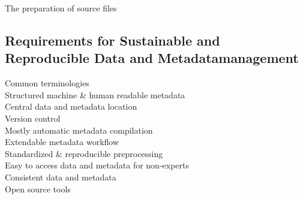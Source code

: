 The preparation of source files



\subsection{Requirements for Sustainable and Reproducible Data and Metadatamanagement}

\begin{description}
 \item[Common terminologies]
 \item[Structured machine \& human readable metadata]
 \item[Central data and metadata location]
 \item[Version control]
 \item[Mostly automatic metadata compilation]
 \item[Extendable metadata workflow]
 \item[Standardized \& reproducible preprocessing]
 \item[Easy to access data and metadata for non-experts]
 \item[Consistent data and metadata]
 \item[Open source tools]
\end{description}









